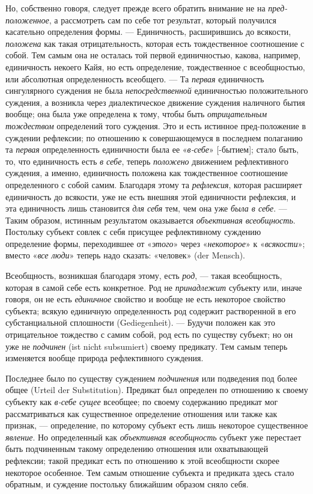 \documentclass[twoside]{article}
\begin{document}
{{Но, собственно говоря, следует прежде всего обратить внимание
не на {\em пред-положенное},
а рассмотреть сам по себе тот результат, который получился
касательно определения формы. — Единичность, расширившись до
всякости, {\em положена}
как такая отрицательность, которая есть тождественное
соотношение с собой. Тем самым она не осталась той первой единичностью,
какова, например, единичность некоего Кайя, но есть определение,
тождественное с всеобщностью, или абсолютная определенность всеобщего. —
Та {\em первая}
единичность сингулярного суждения не была
{\em непосредственной}
единичностью положительного суждения, а возникла через
диалектическое движение суждения наличного бытия вообще; она была уже
определена к тому, чтобы быть
{\em отрицательным тождеством}
определений того суждения. Это и есть истинное пред-положение
в суждении рефлексии; по отношению к совершающемуся в последнем полаганию
та {\em первая}
определенность единичности была ее
«{\em в-себе}» [-бытием];
стало быть, то, что единичность есть
{\em в себе}, теперь
{\em положено} движением
рефлективного суждения, а именно, единичность положена как тождественное
соотношение определенного с собой самим. Благодаря этому та
{\em рефлексия}, которая
расширяет единичность до всякости, уже не есть внешняя этой единичности
рефлексия, и эта единичность лишь становится
{\em для себя} тем, чем
она уже {\em была в себе}. —
Таким образом, истинным результатом оказывается
{\em объективная всеобщность}.
Постольку субъект совлек с себя присущее рефлективному
суждению определение формы, переходившее от
«{\em этого}» через
«{\em некоторое}» к
«{\em всякости}»; вместо
«{\em все люди}» теперь
надо сказать: «человек» (der Mensch).

Всеобщность, возникшая благодаря этому, есть
{\em род}, — такая
всеобщность, которая в самой себе есть конкретное. Род не
{\em принадлежит}
субъекту или, иначе говоря, он не есть
{\em единичное} свойство
и вообще не есть некоторое свойство субъекта; всякую единичную
определенность род содержит растворенной в его субстанциальной сплошности
(Gediegenheit). — Будучи положен как это отрицательное
тождество с самим собой, род есть по существу субъект; но он уже не
{\em подчинен} (ist nicht subsumiert)
своему предикату. Тем самым теперь изменяется вообще природа
рефлективного суждения.

Последнее было по существу суждением
{\em подчинения} или
подведения под более общее (Urteil der Substitution).
Предикат был определен по отношению к своему субъекту как
{\em в-себе сущее}
всеобщее; по своему содержанию предикат мог рассматриваться
как существенное определение отношения или также как признак, —
определение, по которому субъект есть лишь некоторое
существенное {\em явление}.
Но определенный как
{\em объективная всеобщность}
субъект уже перестает быть подчиненным такому определению
отношения или охватывающей рефлексии; такой предикат есть по отношению к
этой всеобщности скорее некоторое особенное. Тем самым отношение субъекта и
предиката здесь стало обратным, и суждение постольку ближайшим образом
сняло себя.

}}
\end{document}
